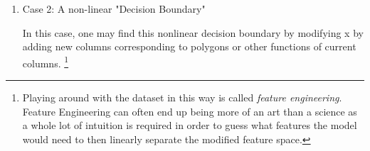 \begin{enumerate}
    The final bit of insight we can exploit is in the nature of the problem. In all cases, $\vy$ is either $0$ or $1$. So, we can use this fact to serve as a gate between the two cases of the cost function. Hence, we can penalize $\vv$ if $-\vy \log(g(\overrightarrow{\vx}^T\overrightarrow{\vv})) - (1 - \vy) \log(1 - g(\overrightarrow{\vx}^T\overrightarrow{\vv}))$ is large. 
    
    Finally, all we are left to do is accumulating this cost function over the whole train dataset.
    
    \begin{definition}
    Given $\MX^{{(train)}}, \vy^{{(train)}}$, define $log: \R^m \rightarrow \R^m$ $$\log(x_1, ... , x_m) = (\log(x_1), ... , \log(x_m))$$ and $G: \R^m \rightarrow \R^m$ $$G(x_1, ... , x_m) = (g(x_1), ... , g(x_m))$$
    $$J(\vv) = \frac{1}{m} \sum_{i = 1}^{m} - (1 - \vy_i)\log(1 - g(\overrightarrow{\vx_{i,*}}^T\overrightarrow{\vv})) -\vy \log(g(\overrightarrow{\vx_i}^T\overrightarrow{\vv}))$$
       which can be rewritten in the more conventient notation of matrix multiplication: 
    $$J(\vv) = \frac{1}{m}[-(\overrightarrow{1} - \overrightarrow{\vy})^T \log(\overrightarrow{1} - \overrightarrow{G}(\hat{\MX}\overrightarrow{\vv})) - \overrightarrow{\vy}^T \log(G(\hat{\MX}\overrightarrow{\vv})]$$
    
    and find $\vv^* = argmin (J(\vv))$ using some form of gradient descent.
    
    \end{definition}
    
    \begin{proposition}
        $$\nabla{v}J(\vv) = \frac{1}{m}(G(\hat{\MX}\overrightarrow{\vv}) - \overrightarrow{\vy})^T\hat{\MX}$$
        $$H(J)(\vv) = \frac{1}{m}\hat{\MX}^TD(\vv)\hat{\MX}$$
        $$D(\vv) = diag(G'(\hat{\MX}\overrightarrow{\vv}))$$
        $$G'(x_1, ... , x_m) = (g'(x_1), ... , g'(x_m))$$
        J is twice differentiable convex, and has Lipschitz continuous gradient.
 
    Therefore gradient descent reliably finds the global minimum (if it exists).
    \end{proposition}

    \begin{proof}
    This proof is left as an exercise to the reader.
    \end{proof}    
    
    \item Case 2: A non-linear "Decision Boundary"
    
    In this case, one may find this nonlinear decision boundary by modifying x by adding new columns corresponding to polygons or other functions of current columns. \footnote{Playing around with the dataset in this way is called \textit{feature engineering}. Feature Engineering can often end up being more of an art than a science as a whole lot of intuition is required in order to guess what features the model would need to then linearly separate the modified feature space.}
\end{enumerate}

